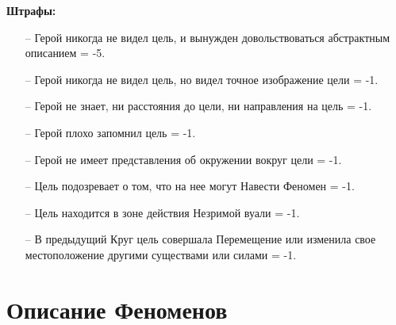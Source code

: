 \textbf{Штрафы:}
\begin{itemize}
\item[--]Герой никогда не видел цель, и вынужден довольствоваться абстрактным описанием = -5.
\item[--]Герой никогда не видел цель, но видел точное изображение цели = -1.
\item[--]Герой не знает, ни расстояния до цели, ни направления на цель = -1.
\item[--]Герой плохо запомнил цель = -1.
\item[--]Герой не имеет представления об окружении вокруг цели = -1.
\item[--]Цель подозревает о том, что на нее могут Навести Феномен = -1.
\item[--]Цель находится в зоне действия Незримой вуали = -1.
\item[--]В предыдущий Круг цель совершала Перемещение или изменила свое местоположение другими существами или силами = -1.
\end{itemize}

\section{Описание Феноменов}
